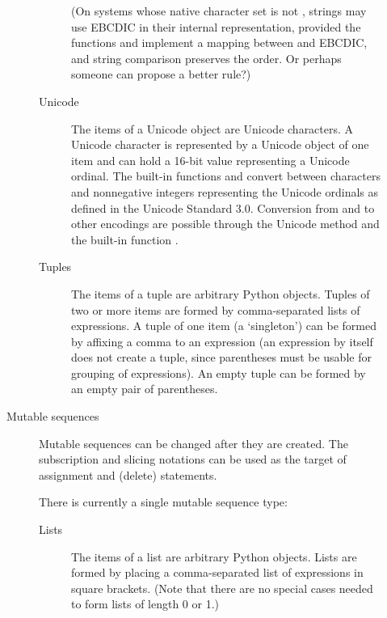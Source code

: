 \begin{description}
\begin{description}
\begin{description}
(On systems whose native character set is not \ASCII{}, strings may use
EBCDIC in their internal representation, provided the functions
 and  implement a mapping between \ASCII{} and
EBCDIC, and string comparison preserves the \ASCII{} order.
Or perhaps someone can propose a better rule?)

\item[Unicode]
The items of a Unicode object are Unicode characters.  A Unicode
character is represented by a Unicode object of one item and can hold
a 16-bit value representing a Unicode ordinal.  The built-in functions
 and
 convert between characters and
nonnegative integers representing the Unicode ordinals as defined in
the Unicode Standard 3.0. Conversion from and to other encodings are
possible through the Unicode method  and the built-in
function .

\item[Tuples]
The items of a tuple are arbitrary Python objects.
Tuples of two or more items are formed by comma-separated lists
of expressions.  A tuple of one item (a `singleton') can be formed
by affixing a comma to an expression (an expression by itself does
not create a tuple, since parentheses must be usable for grouping of
expressions).  An empty tuple can be formed by an empty pair of
parentheses.

\end{description} %

\item[Mutable sequences]
Mutable sequences can be changed after they are created.  The
subscription and slicing notations can be used as the target of
assignment and  (delete) statements.

There is currently a single mutable sequence type:

\begin{description}

\item[Lists]
The items of a list are arbitrary Python objects.  Lists are formed
by placing a comma-separated list of expressions in square brackets.
(Note that there are no special cases needed to form lists of length 0
or 1.)


\end{description}
\end{description}
\end{description}
